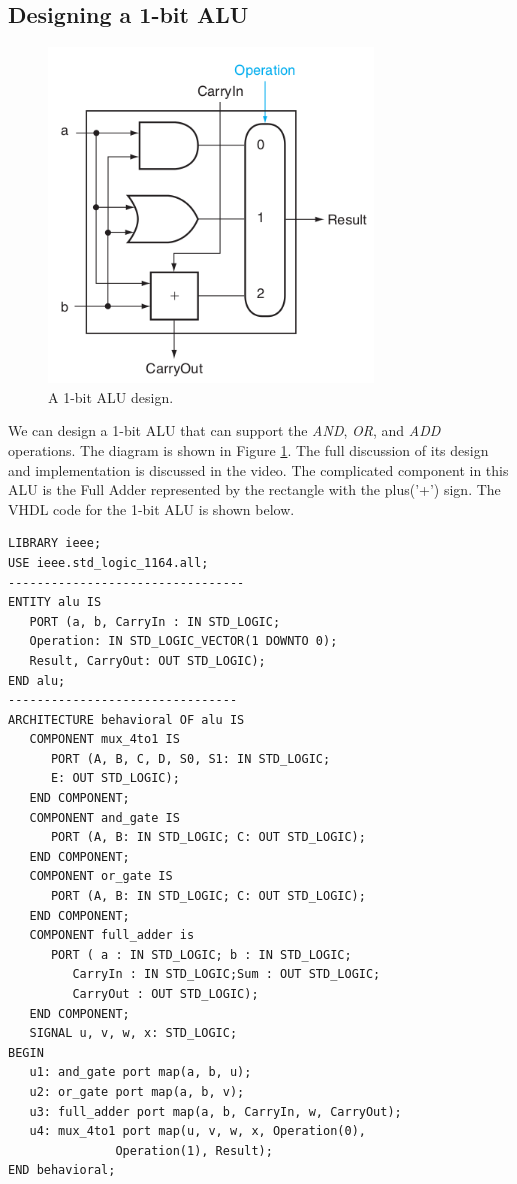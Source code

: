 \documentclass[a4paper, 11pt,oneside]{article}
\begin{document}
\subsection{Designing a 1-bit ALU}

\begin{figure}[H]
	\begin{center}
		\includegraphics[height=3.5in]{alu.png}
		\caption{A 1-bit ALU design.}
		\label{fig:alu} 
	\end{center}
\end{figure}


We can design a 1-bit ALU that can support the \textit{AND}, \textit{OR}, and \textit{ADD} operations. The diagram is shown in
Figure \ref{fig:alu}. The full discussion of its design and implementation is discussed in the video. The complicated component in this ALU is the Full Adder represented by the rectangle with the plus('+') sign. The VHDL code for the 1-bit ALU is shown below.



\begin{verbatim}
LIBRARY ieee;
USE ieee.std_logic_1164.all;
---------------------------------
ENTITY alu IS
   PORT (a, b, CarryIn : IN STD_LOGIC;
   Operation: IN STD_LOGIC_VECTOR(1 DOWNTO 0);
   Result, CarryOut: OUT STD_LOGIC);
END alu;
--------------------------------
ARCHITECTURE behavioral OF alu IS
   COMPONENT mux_4to1 IS
      PORT (A, B, C, D, S0, S1: IN STD_LOGIC;
      E: OUT STD_LOGIC);
   END COMPONENT;
   COMPONENT and_gate IS
      PORT (A, B: IN STD_LOGIC; C: OUT STD_LOGIC);
   END COMPONENT;
   COMPONENT or_gate IS
      PORT (A, B: IN STD_LOGIC; C: OUT STD_LOGIC);
   END COMPONENT;
   COMPONENT full_adder is
      PORT ( a : IN STD_LOGIC; b : IN STD_LOGIC;
         CarryIn : IN STD_LOGIC;Sum : OUT STD_LOGIC;
         CarryOut : OUT STD_LOGIC);
   END COMPONENT;
   SIGNAL u, v, w, x: STD_LOGIC;
BEGIN
   u1: and_gate port map(a, b, u);
   u2: or_gate port map(a, b, v);
   u3: full_adder port map(a, b, CarryIn, w, CarryOut); 
   u4: mux_4to1 port map(u, v, w, x, Operation(0), 
               Operation(1), Result);
END behavioral;
\end{verbatim}
\end{document}
